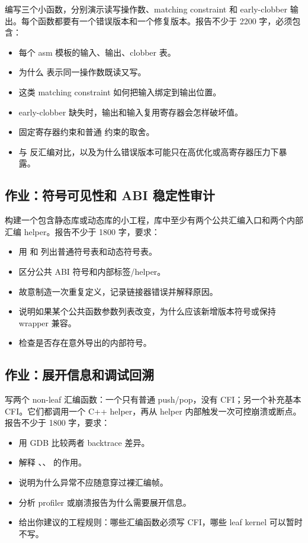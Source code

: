 \begin{exercisebox}
编写三个小函数，分别演示读写操作数、matching constraint 和 early-clobber 输出。每个函数都要有一个错误版本和一个修复版本。报告不少于 2200 字，必须包含：

\begin{itemize}
  \item 每个 asm 模板的输入、输出、clobber 表。
  \item 为什么  表示同一操作数既读又写。
  \item {} 这类 matching constraint 如何把输入绑定到输出位置。
  \item early-clobber 缺失时，输出和输入复用寄存器会怎样破坏值。
  \item 固定寄存器约束和普通  约束的取舍。
  \item {} 与  反汇编对比，以及为什么错误版本可能只在高优化或高寄存器压力下暴露。
\end{itemize}

\subsection*{作业：符号可见性和 ABI 稳定性审计}

构建一个包含静态库或动态库的小工程，库中至少有两个公共汇编入口和两个内部汇编 helper。报告不少于 1800 字，要求：

\begin{itemize}
  \item 用  和  列出普通符号表和动态符号表。
  \item 区分公共 ABI 符号和内部标签/helper。
  \item 故意制造一次重复定义，记录链接器错误并解释原因。
  \item 说明如果某个公共函数参数列表改变，为什么应该新增版本符号或保持 wrapper 兼容。
  \item 检查是否存在意外导出的内部符号。
\end{itemize}

\subsection*{作业：展开信息和调试回溯}

写两个 non-leaf 汇编函数：一个只有普通 push/pop，没有 CFI；另一个补充基本 CFI。它们都调用一个 C++ helper，再从 helper 内部触发一次可控崩溃或断点。报告不少于 1800 字，要求：

\begin{itemize}
  \item 用 GDB 比较两者 backtrace 差异。
  \item 解释 、、 的作用。
  \item 说明为什么异常不应随意穿过裸汇编帧。
  \item 分析 profiler 或崩溃报告为什么需要展开信息。
  \item 给出你建议的工程规则：哪些汇编函数必须写 CFI，哪些 leaf kernel 可以暂时不写。
\end{itemize}


\end{exercisebox}
